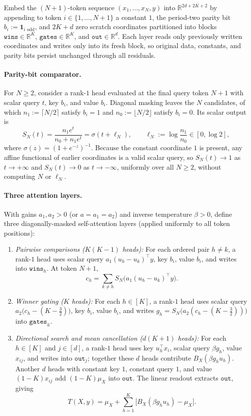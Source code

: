 \documentclass[11pt]{article}
\theoremstyle{plain}
\theoremstyle{definition}
\theoremstyle{remark}
\begin{document}
Embed the $(N+1)$-token sequence $(x_1, \dots, x_N, y)$ into $\mathbb{R}^{2d + 2K + 2}$ by appending to token $i \in \{1, \dots, N+1\}$ a constant $1$, the period-two parity bit $b_i := \mathbf{1}_{i \text{ odd}}$, and $2K + d$ zero scratch coordinates partitioned into blocks $\texttt{wins} \in \mathbb{R}^K$, $\texttt{gates} \in \mathbb{R}^K$, and $\texttt{out} \in \mathbb{R}^d$.
Each layer reads only previously written coordinates and writes only into its fresh block, so original data, constants, and parity bits persist unchanged through all residuals.

\paragraph{Parity-bit comparator.}
For $N \ge 2$, consider a rank-$1$ head evaluated at the final query token $N + 1$ with scalar query $t$, key $b_i$, and value $b_i$.
Diagonal masking leaves the $N$ candidates, of which $n_1 := \lceil N/2 \rceil$ satisfy $b_i = 1$ and $n_0 := \lfloor N/2 \rfloor$ satisfy $b_i = 0$.
Its scalar output is
\[
S_N(t) = \frac{n_1 e^t}{n_0 + n_1 e^t} = \sigma(t + \ell_N),
\qquad
\ell_N := \log\frac{n_1}{n_0} \in [0, \log 2],
\]
where $\sigma(z) = (1 + e^{-z})^{-1}$.
Because the constant coordinate $1$ is present, any affine functional of earlier coordinates is a valid scalar query, so $S_N(t) \to 1$ as $t \to +\infty$ and $S_N(t) \to 0$ as $t \to -\infty$, uniformly over all $N \ge 2$, without computing $N$ or $\ell_N$.

\paragraph{Three attention layers.}
With gains $a_1, a_2 > 0$ (or $a = a_1 = a_2$) and inverse temperature $\beta > 0$, define three diagonally-masked self-attention layers (applied uniformly to all token positions):
\begin{enumerate}[label=\textup{\arabic*.},leftmargin=2em,itemsep=2pt]
\item \emph{Pairwise comparisons ($K(K-1)$ heads):} For each ordered pair $h \neq k$, a rank-$1$ head uses scalar query $a_1(u_h - u_k)^\top y$, key $b_i$, value $b_i$, and writes into $\texttt{wins}_h$. At token $N + 1$,
\[
c_h = \sum_{k \neq h} S_N\bigl(a_1(u_h - u_k)^\top y\bigr).
\]
\item \emph{Winner gating ($K$ heads):} For each $h \in [K]$, a rank-$1$ head uses scalar query $a_2\bigl(c_h - (K - \tfrac{3}{2})\bigr)$, key $b_i$, value $b_i$, and writes $g_h = S_N\bigl(a_2(c_h - (K - \tfrac{3}{2}))\bigr)$ into $\texttt{gates}_h$.
\item \emph{Directional search and mean cancellation ($d(K+1)$ heads):} For each $h \in [K]$ and $j \in [d]$, a rank-$1$ head uses key $u_h^\top x_i$, scalar query $\beta g_h$, value $x_{ij}$, and writes into $\texttt{out}_j$; together these $d$ heads contribute $B_X(\beta g_h u_h)$. Another $d$ heads with constant key $1$, constant query $1$, and value $(1 - K)x_{ij}$ add $(1 - K)\mu_X$ into $\texttt{out}$. The linear readout extracts $\texttt{out}$, giving
\[
T(X, y) = \mu_X + \sum_{h=1}^K \bigl[B_X(\beta g_h u_h) - \mu_X\bigr].
\]
\end{enumerate}
\end{document}
